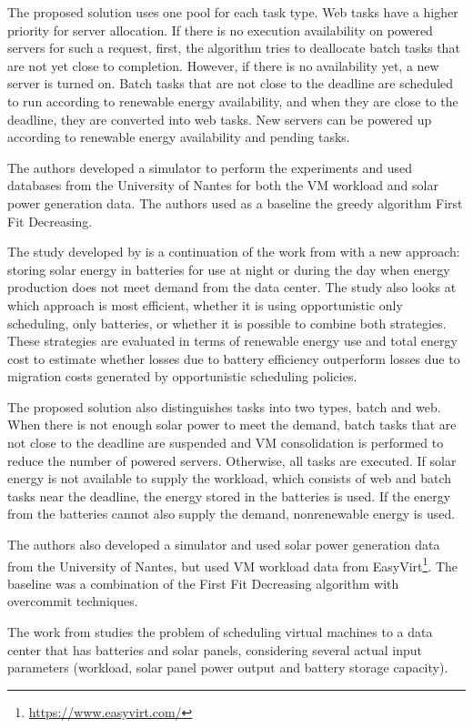 \documentclass[12pt,a4paper]{article}
\begin{document}
The proposed solution uses one pool for each task type. Web tasks have a higher priority for server allocation. If there is no execution availability on powered servers for such a request, first, the algorithm tries to deallocate batch tasks that are not yet close to completion. However, if there is no availability yet, a new server is turned on. Batch tasks that are not close to the deadline are scheduled to run according to renewable energy availability, and when they are close to the deadline, they are converted into web tasks. New servers can be powered up according to renewable energy availability and pending tasks.

The authors developed a simulator to perform the experiments and used databases from the University of Nantes for both the VM workload and solar power generation data. The authors used as a baseline the greedy algorithm First Fit Decreasing.

The study developed by \citet{li2017} is a continuation of the work from \citet{PIKA}  with a new approach: storing solar energy in batteries for use at night or during the day when energy production does not meet demand from the data center. The study also looks at which approach is most efficient, whether it is using opportunistic only scheduling, only batteries, or whether it is possible to combine both strategies. These strategies are evaluated in terms of renewable energy use and total energy cost to estimate whether losses due to battery efficiency outperform losses due to migration costs generated by opportunistic scheduling policies.

The proposed solution also distinguishes tasks into two types, batch and web. When there is not enough solar power to meet the demand, batch tasks that are not close to the deadline are suspended and VM consolidation is performed to reduce the number of powered servers. Otherwise, all tasks are executed. If solar energy is not available to supply the workload, which consists of web and batch tasks near the deadline, the energy stored in the batteries is used. If the energy from the batteries cannot also supply the demand, nonrenewable energy is used.

The authors also developed a simulator and used solar power generation data from the University of Nantes, but used VM workload data from EasyVirt\footnote{\url{https://www.easyvirt.com/}}. The baseline was a combination of the First Fit Decreasing algorithm with overcommit techniques.

The work from \citet{Courchelle}  studies the problem of scheduling virtual machines to a data center that has batteries and solar panels, considering several actual input parameters (workload, solar panel power output and battery storage capacity).
\end{document}

